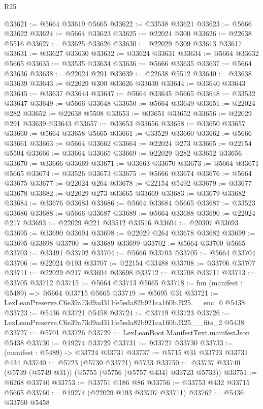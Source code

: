 \begin{lexlean}{R25}
\begin{coremodule}
@33621 := @5664 @33619 @5665
@33622 := @33538 @33621
@33623 := @5666 @33622
@33624 := @5664 @33623
@33625 := @22024 @300
@33626 := @22638 @5516
@33627 := @33625 @33626
@33630 := @22029 @309 @33613 @33617
@33631 := @33627 @33630
@33632 := @33624 @33631
@33634 := @5664 @33632 @5665
@33635 := @33535 @33634
@33636 := @5666 @33635
@33637 := @5664 @33636
@33638 := @22024 @291
@33639 := @22638 @5512
@33640 := @33638 @33639
@33643 := @22029 @300 @33626 @33630
@33644 := @33640 @33643
@33645 := @33637 @33644
@33647 := @5664 @33645 @5665
@33648 := @33532 @33647
@33649 := @5666 @33648
@33650 := @5664 @33649
@33651 := @22024 @282
@33652 := @22638 @5508
@33653 := @33651 @33652
@33656 := @22029 @291 @33639 @33643
@33657 := @33653 @33656
@33658 := @33650 @33657
@33660 := @5664 @33658 @5665
@33661 := @33529 @33660
@33662 := @5666 @33661
@33663 := @5664 @33662
@33664 := @22024 @273
@33665 := @22154 @5504
@33666 := @33664 @33665
@33669 := @22029 @282 @33652 @33656
@33670 := @33666 @33669
@33671 := @33663 @33670
@33673 := @5664 @33671 @5665
@33674 := @33526 @33673
@33675 := @5666 @33674
@33676 := @5664 @33675
@33677 := @22024 @264
@33678 := @22154 @5492
@33679 := @33677 @33678
@33682 := @22029 @273 @33665 @33669
@33683 := @33679 @33682
@33684 := @33676 @33683
@33686 := @5664 @33684 @5665
@33687 := @33523 @33686
@33688 := @5666 @33687
@33689 := @5664 @33688
@33690 := @22024 @217
@33693 := @22029 @221 @33512 @33516
@33694 := @20307 @33693
@33695 := @33690 @33694
@33698 := @22029 @264 @33678 @33682
@33699 := @33695 @33698
@33700 := @33689 @33699
@33702 := @5664 @33700 @5665
@33703 := @33491 @33702
@33704 := @5666 @33703
@33705 := @5664 @33704
@33706 := @22024 @193
@33707 := @22154 @33488
@33708 := @33706 @33707
@33711 := @22029 @217 @33694 @33698
@33712 := @33708 @33711
@33713 := @33705 @33712
@33715 := @5664 @33713 @5665
@33718 := fun (manifest : @5489) => @5664 @33715 @5665
@33719 := @5695 @31
@33721 := LexLeanPreserve.C6e39a73d9ad311fe5eda82b921ca160b.R25.__enc_0 @5438
@33723 := @5436 @33721 @5458
@33724 := @33719 @33723
@33726 := LexLeanPreserve.C6e39a73d9ad311fe5eda82b921ca160b.R25.__fits_2 @5438
@33727 := @5701 @33726
@33729 := LexLeanBoot.ManifestText.manifestJson @5438
@33730 := @19274 @33729
@33731 := @33727 @33730
@33733 := (manifest : @5489) -> @33724 @33731
@33737 := @5715 @31 @33723 @33731 @434
@33740 := @5723 (@5730 @33721) @5733
@33750 := @33737 @33740 (@5739 (@5749 @31)) (@5755 (@5756 (@5757 @434) @33723 @5733))
@33751 := @6268 @33740
@33753 := @33751 @186 @86
@33756 := @33753 @432 @33715 @5665
@33760 := @19274 (@22029 @193 @33707 @33711)
@33762 := @5436 @33760 @5458

\end{coremodule}
\end{lexlean}
